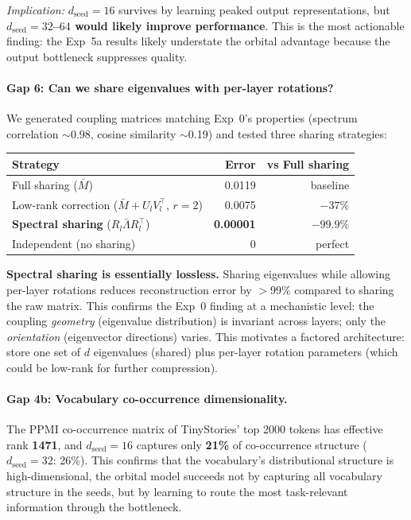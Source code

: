 \documentclass[11pt, a4paper]{article}
\theoremstyle{remark}
\begin{document}
\textit{Implication:} $d_{\text{seed}} = 16$ survives by learning peaked output representations,
but \textbf{$d_{\text{seed}} = 32$--$64$ would likely improve performance}.
This is the most actionable finding: the Exp~5a results likely understate the orbital
advantage because the output bottleneck suppresses quality.

\paragraph{Gap 6: Can we share eigenvalues with per-layer rotations?}
We generated coupling matrices matching Exp~0's properties (spectrum correlation $\sim$0.98,
cosine similarity $\sim$0.19) and tested three sharing strategies:

\begin{center}\small
\renewcommand{\arraystretch}{1.2}
\begin{tabular}{lrr}
\toprule
\textbf{Strategy} & \textbf{Error} & \textbf{vs Full sharing} \\
\midrule
Full sharing ($\bar{M}$) & 0.0119 & baseline \\
Low-rank correction ($\bar{M} + U_l V_l^\top$, $r{=}2$) & 0.0075 & $-37\%$ \\
\textbf{Spectral sharing} ($R_l \bar{\Lambda} R_l^\top$) & \textbf{0.00001} & $\mathbf{-99.9\%}$ \\
Independent (no sharing) & 0 & perfect \\
\bottomrule
\end{tabular}
\end{center}

\noindent
\textbf{Spectral sharing is essentially lossless.}
Sharing eigenvalues while allowing per-layer rotations reduces reconstruction error by
$>$99\% compared to sharing the raw matrix.
This confirms the Exp~0 finding at a mechanistic level: the coupling \emph{geometry}
(eigenvalue distribution) is invariant across layers; only the \emph{orientation}
(eigenvector directions) varies.
This motivates a factored architecture: store one set of $d$ eigenvalues (shared) plus
per-layer rotation parameters (which could be low-rank for further compression).

\paragraph{Gap 4b: Vocabulary co-occurrence dimensionality.}
The PPMI co-occurrence matrix of TinyStories' top 2000 tokens has effective rank
\textbf{1471}, and $d_{\text{seed}} = 16$ captures only \textbf{21\%} of co-occurrence
structure ($d_{\text{seed}} = 32$: 26\%).
This confirms that the vocabulary's distributional structure is high-dimensional, the
orbital model succeeds not by capturing all vocabulary structure in the seeds, but by
learning to route the most task-relevant information through the bottleneck.
\end{document}
